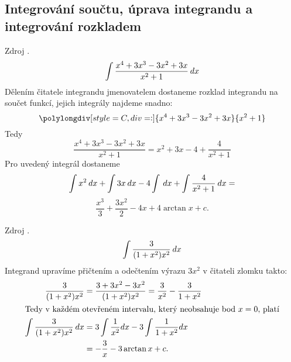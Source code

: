     \subsection{Integrování součtu, úprava integrandu a integrování rozkladem}
      \begin{example}
        Zdroj \cite[s.~29]{Knichal}.
        \begin{equation}\label{MA:int_ex_01}
          \int{\frac{x^4+3x^3-3x^2+3x}{x^2+1}\hspace{2pt}dx}
        \end{equation}
        Dělením čitatele integrandu jmenovatelem  dostaneme rozklad integrandu na součet funkcí,
        jejich integrály najdeme snadno:
         \begin{equation*} 
           \polylongdiv[style=C,div=:]{x^4+3x^3-3x^2+3x}{x^2+1}
         \end{equation*}
         Tedy
         \begin{equation*}
           \frac{x^4+3x^3-3x^2+3x}{x^2+1} = x^2+3x-4+\frac{4}{x^2+1}  
         \end{equation*}
         Pro uvedený integrál dostaneme
         \begin{equation*}
           \int{x^2}\hspace{2pt}dx+\int{3x}\hspace{2pt}dx-4\int\hspace{2pt}dx+\int{\frac{4}{x^2+1}\hspace{2pt}dx} =
         \end{equation*}
         \begin{equation*} 
             \frac{x^3}{3}+\frac{3x^2}{2}-4x+4\arctan x + c.
         \end{equation*}
      \end{example}
      
      \begin{example}
        Zdroj \cite[s.~29]{Knichal}.
        \begin{equation}\label{MA:int_ex_02}
          \int\frac{3}{(1+x^2)x^2}\hspace{2pt}dx
        \end{equation}
        Integrand upravíme přičtením a odečtením výrazu $3x^2$ v čitateli zlomku takto:
        \begin{align*}
          \frac{3}{(1+x^2)x^2} 
            &= \frac{3+3x^2-3x^2}{(1+x^2)x^2} = \frac{3}{x^2}-\frac{3}{1+x^2}                      \\  
          \intertext{Tedy v každém otevřeném intervalu, který neobsahuje bod \(x=0\), platí}
          \int{\frac{3}{(1+x^2)x^2}\hspace{2pt}dx} 
            &= 3\int{\frac{1}{x^2}dx} - 3\int{\frac{1}{1+x^2}dx}                                   \\
            &= -\frac{3}{x}-3\arctan x + c. 
        \end{align*}
      \end{example}
      
